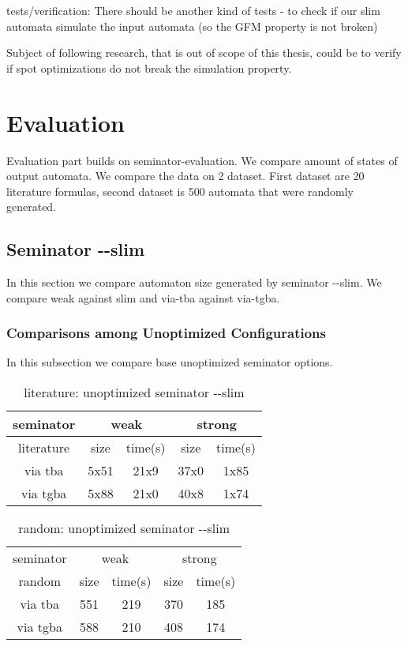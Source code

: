 \documentclass[
	digital
nolof, nolot
]{fithesis3}
\begin{document}
	
	
	tests/verification:
	There should be another kind of tests - to check if our slim automata simulate the input automata (so the GFM property is not broken)
	
	Subject of following research, that is out of scope of this thesis, could be to verify if spot optimizations do not break the simulation property. 
	
	\chapter{Evaluation}
	Evaluation part builds on seminator-evaluation. We compare amount of states of output automata. We compare the data on 2 dataset. First dataset are 20 literature formulas, second dataset is 500 automata that were randomly generated.
	
	
	\section{Seminator -\/-slim}
	In this section we compare automaton size generated by seminator -{}-slim.
	We compare weak against slim and via-tba against via-tgba.
	\subsection{Comparisons among Unoptimized Configurations}
	In this subsection we compare base unoptimized seminator options.
\begin{table}[ht]
	\centering
	\caption{literature: unoptimized seminator -\/-slim}
		\begin{tabular}{ |c||c|c|c|c| } 
			\hline
			seminator&\multicolumn{2}{c|}{weak}&\multicolumn{2}{c|}{strong} \\
			\hline
			literature&size&time(s)&size&time(s)\\
			\hhline{|=====|}
			
			via tba&5x51&21x9& 37x0 &1x85\\
			\hline
			via tgba&5x88&21x0& 40x8&1x74\\ 
			\hline
		\end{tabular}
\end{table}
	
	
	\begin{table}[ht]
		\centering
		\caption{random: unoptimized seminator -\/-slim}
		\begin{tabular}{ |c||c|c|c|c| } 
			\hline
			seminator&\multicolumn{2}{c|}{weak}&\multicolumn{2}{c|}{strong} \\
			\hhline{|=====|}
			random&size&time(s)&size&time(s)\\
			\hline
			via tba&551&219& 370 &185\\
			\hline
			via tgba&588&210& 408&174\\ 
			\hline
		\end{tabular}
\end{table}
	
\end{document}
